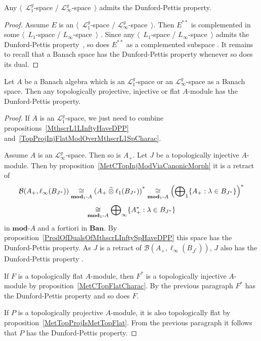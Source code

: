 \begin{proposition}\label{MthscrL1LInftyHaveDPP} Any
$\langle$~$\mathscr{L}_1^g$-space / $\mathscr{L}_\infty^g$-space~$\rangle$
admits the Dunford-Pettis property.
\end{proposition}
\begin{proof} Assume $E$ is an $\langle$~$\mathscr{L}_1^g$-space /
$\mathscr{L}_\infty^g$-space~$\rangle$. Then $E^{**}$ is complemented in some
$\langle$~$L_1$-space / $L_\infty$-space~$\rangle$ \cite[corollary 23.2.1(3)]{DefFloTensNorOpId}. Since any $\langle$~$L_1$-space /
$L_\infty$-space~$\rangle$ admits the Dunford-Pettis
property~\cite{GrothApllFaiblCompSpCK}, so does $E^{**}$ as a complemented
subspace \cite[proposition 13.44]{FabHabBanSpTh}. It remains to recall that a
Banach space has the Dunford-Pettis property whenever so does its dual.
\end{proof}

\begin{theorem}\label{TopProjInjFlatModOverMthscrL1OrLInftySpHaveDPP} Let $A$ be
a Banach algebra which is an $\mathscr{L}_1^g$-space or an
$\mathscr{L}_\infty^g$-space as a Banach space. Then any topologically projective,
injective or flat $A$-module has the Dunford-Pettis property.
\end{theorem}
\begin{proof} If $A$ is an $\mathscr{L}_1^g$-space, we just need to combine
propositions~\ref{MthscrL1LInftyHaveDPP}
and~\ref{TopProjInjFlatModOverMthscrL1SpCharac}. 

Assume $A$ is an $\mathscr{L}_\infty^g$-space. Then so is $A_+$. Let $J$ be a
topologically injective $A$-module. Then by
proposition~\ref{MetCTopInjModViaCanonicMorph} it is a retract of 
\[
\mathcal{B}(A_+,\ell_\infty(B_{J^*}))
\mathrel{\mathop{\cong}\limits_{\mathbf{mod}_1\text{-}A}}
{(A_+\mathbin{\widehat{\otimes}}\ell_1(B_{J^*}))}^*
\mathrel{\mathop{\cong}\limits_{\mathbf{mod}_1\text{-}A}}
{\left(\bigoplus\nolimits_1 \{ A_+:\lambda\in B_{J^*} \}\right)}^*
\]
\[
\mathrel{\mathop{\cong}\limits_{\mathbf{mod}_1\text{-}A}}
\bigoplus\nolimits_\infty \{ A_+^*:\lambda\in B_{J^*} \}
\] 
in $\mathbf{mod}\text{-}A$ and a fortiori in $\mathbf{Ban}$. By
proposition~\ref{ProdOfDualsOfMthscrLInftySpHaveDPP} this space has the
Dunford-Pettis property. As $J$ is a retract 
of $\mathcal{B}(A_+,\ell_\infty(B_{J^*}))$, $J$ also has 
the Dunford-Pettis property \cite[proposition 13.44]{FabHabBanSpTh}. 

If $F$ is a topologically flat $A$-module, then $F^*$ is a topologically
injective $A$-module by proposition~\ref{MetCTopFlatCharac}. By the previous
paragraph $F^*$ has the Dunford-Pettis property and so does $F$.

If $P$ is a topologically projective $A$-module, it is also topologically flat
by proposition~\ref{MetTopProjIsMetTopFlat}. From the previous paragraph it follows
that $P$ has the Dunford-Pettis property.
\end{proof}

